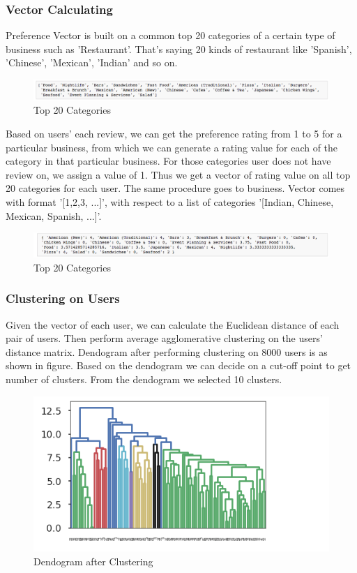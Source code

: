 \documentclass[11pt]{article}
\begin{document}
		\subsubsection{Vector Calculating}
		Preference Vector is built on a common top 20 categories of a certain type of business such as 'Restaurant'. That's saying 20 kinds of restaurant like 'Spanish', 'Chinese', 'Mexican', 'Indian' and so on.
		 \begin{figure}[H]
			\centering
			\includegraphics[scale=0.5] {vector1.png}
			\caption{Top 20 Categories}
		\end{figure}
	
		Based on users' each review, we can get the preference rating from 1 to 5 for a particular business, from which we can generate a rating value for each of the category in that particular business. For those categories user does not have review on, we assign a value of 1. Thus we get a vector of rating value on all top 20 categories for each user. The same procedure goes to business.
		Vector comes with format '[1,2,3, ...]', with respect to a list of categories '[Indian, Chinese, Mexican, Spanish, ...]'.
		 \begin{figure}[H]
			\centering
			\includegraphics[scale=0.5] {vector2.png}
			\caption{Top 20 Categories}
		\end{figure}
		
		\subsubsection{Clustering on Users}
		Given the vector of each user, we can calculate the Euclidean distance of each pair of users. Then perform average agglomerative clustering on the users' distance matrix. Dendogram after performing clustering on 8000 users is as shown in figure. Based on the dendogram we can decide on a cut-off point to get number of clusters. From the dendogram we selected 10 clusters. 
		 \begin{figure}[H]
			\centering
			\includegraphics[scale=0.5] {dendogram.png}
			\caption{Dendogram after Clustering}
		\end{figure}
		
\end{document}
